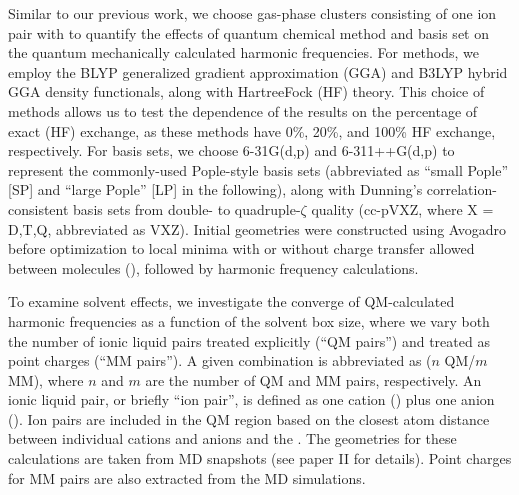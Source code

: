 Similar to our previous work\cite{Brinzer2015}, we choose gas-phase clusters consisting of one \ce{[C4C1im][PF6]} ion pair with  to quantify the effects of quantum chemical method and basis set on the quantum mechanically calculated harmonic frequencies. For methods, we employ the BLYP\cite{Becke1998,Lee1988} generalized gradient approximation (GGA) and B3LYP\cite{Becke1993,Stephens1994} hybrid GGA density functionals, along with Hartree\textendash{}Fock (HF) theory. This choice of methods allows us to test the dependence of the results on the percentage of exact (HF) exchange, as these methods have 0\%, 20\%, and 100\% HF exchange, respectively. For basis sets, we choose 6-31G(d,p)\cite{Hehre1972,Francl1982} and 6-311++G(d,p)\cite{Krishnan1980,McLean1980,Clark1983} to represent the commonly-used Pople-style basis sets (abbreviated as ``small Pople'' [SP] and ``large Pople'' [LP] in the following), along with Dunning's correlation-consistent basis sets from double- to quadruple-\(\zeta\) quality (cc-pVXZ, where X = D,T,Q, abbreviated as VXZ)\cite{Dunning1989,Dunning1993}. Initial geometries were constructed using Avogadro\cite{Hanwell2012,Avogadro} before optimization to local minima with or without charge transfer allowed between molecules (), followed by harmonic frequency calculations.

To examine solvent effects, we investigate the converge of QM-calculated harmonic frequencies as a function of the solvent box size, where we vary both the number of ionic liquid pairs treated explicitly (``QM pairs'') and treated as point charges (``MM pairs''). A given combination is abbreviated as (\(n\) QM/\(m\) MM), where \(n\) and \(m\) are the number of QM and MM pairs, respectively. An ionic liquid pair, or briefly ``ion pair'', is defined as one cation (\ce{[C4C1im]+}) plus one anion (\ce{[PF6]-}). Ion pairs are included in the QM region based on the closest atom distance between individual cations and anions and the . The geometries for these calculations are taken from MD snapshots (see paper II\cite{Daly2016} for details). Point charges for MM pairs are also extracted from the MD simulations.

